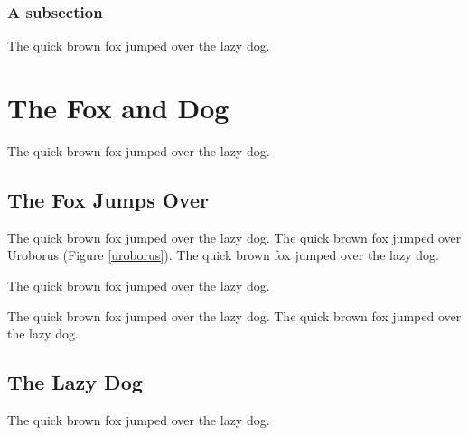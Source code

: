 \documentclass{l4proj}
\begin{document}
\subsection{A subsection}
The quick brown fox jumped over the lazy dog.


\chapter{The Fox and Dog}
The quick brown fox jumped over the lazy dog.


\section{The Fox Jumps Over}
The quick brown fox jumped over the lazy dog.
The quick brown fox jumped over Uroborus (Figure \ref{uroborus}).
The quick brown fox jumped over the lazy dog.


The quick brown fox jumped over the lazy dog.

The quick brown fox jumped over \cite{ckt} the lazy dog.
The quick brown fox jumped over the lazy dog.


\section{The Lazy Dog}
The quick brown fox jumped over the lazy dog.
\end{document}
